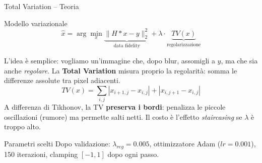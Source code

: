 \documentclass[italian,10pt]{beamer}
\begin{document}
\begin{frame}{Total Variation -- Teoria}
  \begin{block}{Modello variazionale}
    \begin{equation*}
      \hat{x} = \arg\min_x \underbrace{\|H*x - y\|_2^2}_{\text{data fidelity}} + \lambda \cdot \underbrace{TV(x)}_{\text{regolarizzazione}}
    \end{equation*}
  \end{block}
  \vspace{0.15cm}
  \noindent L'idea \`e semplice: vogliamo un'immagine che, dopo blur, assomigli a $y$, ma che sia anche \emph{regolare}. La \textbf{Total Variation} misura proprio la regolarit\`a: somma le differenze assolute tra pixel adiacenti.
  \begin{equation*}
    TV(x) = \sum_{i,j} |x_{i+1,j} - x_{i,j}| + |x_{i,j+1} - x_{i,j}|
  \end{equation*}
  \noindent A differenza di Tikhonov, la TV \textbf{preserva i bordi}: penalizza le piccole oscillazioni (rumore) ma permette salti netti. Il costo \`e l'effetto \textit{staircasing} se $\lambda$ \`e troppo alto.
  \vspace{0.15cm}
  \begin{block}{Parametri scelti}
    Dopo validazione: $\lambda_{reg}=0.005$, ottimizzatore Adam ($lr=0.001$), 150 iterazioni, clamping $[-1,1]$ dopo ogni passo.
  \end{block}
\end{frame}
\end{document}
